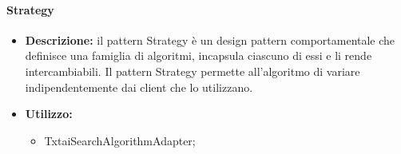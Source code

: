 \paragraph{Strategy}
\begin{itemize}
    \item{\textbf{Descrizione:}} il pattern Strategy è un design pattern comportamentale che definisce una famiglia di algoritmi, incapsula ciascuno di essi e li rende intercambiabili. Il pattern Strategy permette all'algoritmo di variare indipendentemente dai client che lo utilizzano.
    \item{\textbf{Utilizzo:}}
    \begin{itemize}
        \item TxtaiSearchAlgorithmAdapter;
    \end{itemize}
\end{itemize}